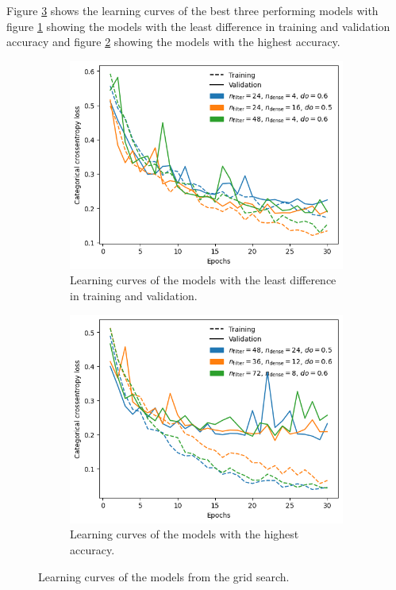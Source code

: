 Figure \ref{fig:gridsearchLearningCurves} shows the learning curves of the best three performing models with figure \ref{fig:SmallestDelta_LearningCurves} showing the models with the least difference in training and validation accuracy and figure \ref{fig:HighestAccuracyLearningCurves} showing the models with the highest accuracy.
\begin{figure}[H]
    \centering
    \begin{subfigure}[B]{.45\textwidth}   %
        \centering
        \includegraphics[width=\linewidth]{plots/SmallestDelta_LearningCurves.png}
        \caption{Learning curves of the models with the least difference in training and validation.}
        \label{fig:SmallestDelta_LearningCurves}
    \end{subfigure}    
    \begin{subfigure}[B]{.45\textwidth}   %
        \centering
        \includegraphics[width=\linewidth]{plots/Best3LearningCurves.png}
        \caption{Learning curves of the models with the highest accuracy.}
        \label{fig:HighestAccuracyLearningCurves}
    \end{subfigure}
    \caption{Learning curves of the models from the grid search.}
    \label{fig:gridsearchLearningCurves}
\end{figure}
